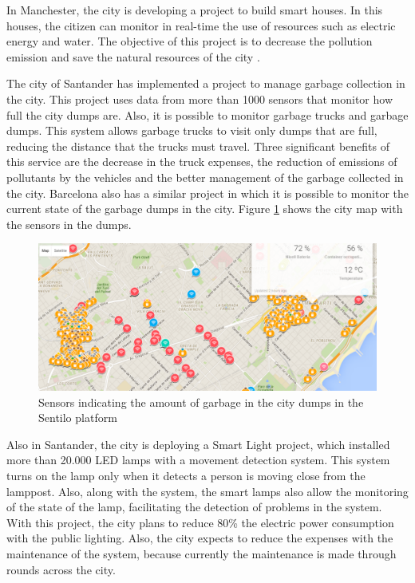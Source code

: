 In Manchester, the city is developing a project to build smart houses. In this houses, the citizen can monitor in real-time the use of resources such as electric energy and water. The objective of this project is to decrease the pollution emission and save the natural resources of the city \cite{manville2014mapping}.

The city of Santander has implemented a project to manage garbage collection in the city\cite{munoz2017santanderlixo}. This project uses data from more than 1000 sensors that monitor how full the city dumps are. Also, it is possible to monitor garbage trucks and garbage dumps. This system allows garbage trucks to visit only dumps that are full, reducing the distance that the trucks must travel. Three significant benefits of this service are the decrease in the truck expenses, the reduction of emissions of pollutants by the vehicles and the better management of the garbage collected in the city. Barcelona also has a similar project in which it is possible to monitor the current state of the garbage dumps in the city. Figure \ref{figure:sentilo} shows the city map with the sensors in the dumps.

\begin{figure}[!htb]
\centering
\includegraphics[scale=0.5]{figuras/sentilo}
\caption{Sensors indicating the amount of garbage in the city dumps in the Sentilo platform}
\label{figure:sentilo}
\end{figure}

Also in Santander, the city is deploying a Smart Light project, which installed more than 20.000 LED lamps with a movement detection system. This system turns on the lamp only when it detects a person is moving close from the lamppost. Also, along with the system, the smart lamps also allow the monitoring of the state of the lamp, facilitating the detection of problems in the system. With this project, the city plans to reduce 80\% the electric power consumption with the public lighting. Also, the city expects to reduce the expenses with the maintenance of the system, because currently the maintenance is made through rounds across the city.

